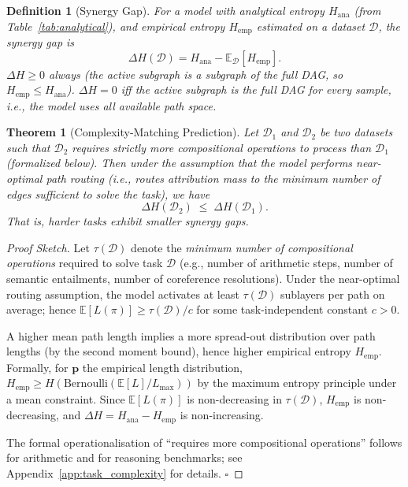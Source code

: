 \documentclass{article}
\newtheorem{theorem}{Theorem}
\newtheorem{definition}{Definition}
\newcommand{\E}{\mathbb{E}}
\newcommand{\Hana}{H_{\mathrm{ana}}}
\newcommand{\Hemp}{H_{\mathrm{emp}}}
\newcommand{\DeltaH}{\Delta H}
\begin{document}
\begin{definition}[Synergy Gap]
\label{def:synergy}
For a model with analytical entropy $\Hana$ (from Table~\ref{tab:analytical}),
and empirical entropy $\Hemp$ estimated on a dataset $\mathcal{D}$, the
\emph{synergy gap} is
\[
  \DeltaH(\mathcal{D}) = \Hana - \E_{\mathcal{D}}[\Hemp].
\]
$\DeltaH \geq 0$ always (the active subgraph is a subgraph of the full DAG,
so $\Hemp \leq \Hana$).  $\DeltaH = 0$ iff the active subgraph is the full DAG
for every sample, i.e., the model uses all available path space.
\end{definition}

\begin{theorem}[Complexity-Matching Prediction]
\label{thm:complexity}
Let $\mathcal{D}_1$ and $\mathcal{D}_2$ be two datasets such that $\mathcal{D}_2$
requires strictly more compositional operations to process than $\mathcal{D}_1$
(formalized below).  Then under the assumption that the model performs near-optimal
path routing (i.e., routes attribution mass to the minimum number of edges sufficient
to solve the task), we have
\[
  \DeltaH(\mathcal{D}_2) \;\leq\; \DeltaH(\mathcal{D}_1).
\]
That is, harder tasks exhibit smaller synergy gaps.
\end{theorem}

\begin{proof}[Proof Sketch]
Let $\tau(\mathcal{D})$ denote the \emph{minimum number of compositional operations}
required to solve task $\mathcal{D}$ (e.g., number of arithmetic steps, number of
semantic entailments, number of coreference resolutions).  Under the near-optimal
routing assumption, the model activates at least $\tau(\mathcal{D})$ sublayers per
path on average; hence $\E[L(\pi)] \geq \tau(\mathcal{D}) / c$ for some
task-independent constant $c > 0$.

A higher mean path length implies a more spread-out distribution over path lengths
(by the second moment bound), hence higher empirical entropy $\Hemp$.
Formally, for $\mathbf{p}$ the empirical length distribution,
$\Hemp \geq H(\mathrm{Bernoulli}(\E[L]/L_{\max}))$ by the maximum entropy principle
under a mean constraint.  Since $\E[L(\pi)]$ is non-decreasing in $\tau(\mathcal{D})$,
$\Hemp$ is non-decreasing, and $\DeltaH = \Hana - \Hemp$ is non-increasing.

The formal operationalisation of ``requires more compositional operations'' follows
\citet{press2022measuring} for arithmetic and \citet{srivastava2022beyond} for
reasoning benchmarks; see Appendix~\ref{app:task_complexity} for details.
$\square$
\end{proof}
\end{document}
